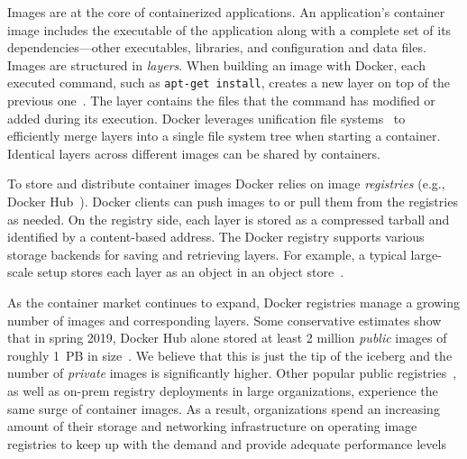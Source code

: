 Images are at the core of containerized applications.
%
An application's container image includes the executable of the application
along with a complete set of its dependencies---other executables, libraries, and
configuration and data files.
%
Images are structured in \emph{layers}. When building an image with Docker, each
executed command, such as \texttt{apt-get install}, creates a new layer on
top of the previous one~\cite{dockerfile}.
%
The layer contains the files that the command has modified or added during its
execution.
%
%
Docker leverages unification file systems~\cite{docker-driver-eval} to
efficiently merge layers into a single file system tree when starting a container.
%
Identical layers across different images can be shared by containers.

To store and distribute container images Docker relies on image
\emph{registries} (e.g., Docker Hub~\cite{docker-hub}).
%
Docker clients can push images to or pull them from the registries as needed.
%
On the registry side, each layer is stored as a compressed tarball and
identified by a content-based address.
%
The Docker registry supports various storage backends for saving and retrieving
layers. For example, a typical large-scale setup stores each layer as an object in an
object store~\cite{s3,swift}.

As the container market continues to expand, Docker registries manage a
growing number of images and corresponding layers.
%
Some conservative estimates show that in spring 2019, Docker Hub alone
stored at least 2 million \emph{public} images of roughly 1~PB in
size~\cite{skourtis2019carving,dedupanalysis}. 
%
We believe that this is just the tip of the iceberg and the number of
\emph{private} images is significantly higher.
%
Other popular public
registries~\cite{amazon-ecr,jfrog-artifactory,azure-cr,google-cr}, as well as
on-prem registry deployments in large organizations, experience the same
surge of container images.
%
As a result,
organizations spend an increasing amount of their storage and networking
infrastructure on operating image registries
to keep up with the demand and provide adequate performance levels
%
%

